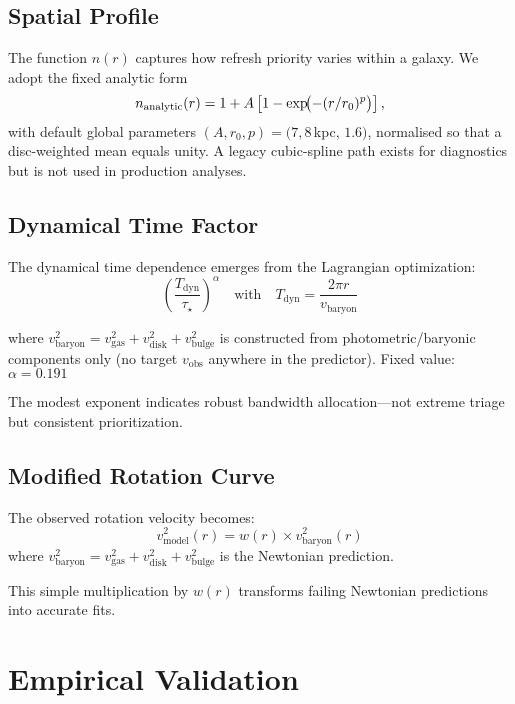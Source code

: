 \documentclass[usenatbib]{mnras}
\begin{document}
\subsection{Spatial Profile}

The function $n(r)$ captures how refresh priority varies within a galaxy. We adopt the fixed analytic form
\begin{equation}
n_{\rm analytic}(r) = 1 + A\left[1 - \exp\!\bigl(-(r/r_0)^p\bigr)\right],
\end{equation}
with default global parameters $(A, r_0, p) = (7, 8$\,kpc, $1.6)$, normalised so that a disc-weighted mean equals unity. A legacy cubic-spline path exists for diagnostics but is not used in production analyses.

\subsection{Dynamical Time Factor}

The dynamical time dependence emerges from the Lagrangian optimization:
\begin{equation}
\left(\frac{T_{\text{dyn}}}{\tau_\star}\right)^\alpha \quad \text{with} \quad T_{\text{dyn}} = \frac{2\pi r}{v_{\text{baryon}}}
\end{equation}

where $v_{\text{baryon}}^2 = v_{\text{gas}}^2 + v_{\text{disk}}^2 + v_{\text{bulge}}^2$ is constructed from photometric/baryonic components only (no target $v_{\text{obs}}$ anywhere in the predictor). Fixed value: $\alpha = 0.191$

The modest exponent indicates robust bandwidth allocation---not extreme triage but consistent prioritization.

\subsection{Modified Rotation Curve}

The observed rotation velocity becomes:
\begin{equation}
v_{\text{model}}^2(r) = w(r) \times v_{\text{baryon}}^2(r)
\end{equation}
where $v_{\text{baryon}}^2 = v_{\text{gas}}^2 + v_{\text{disk}}^2 + v_{\text{bulge}}^2$ is the Newtonian prediction.

This simple multiplication by $w(r)$ transforms failing Newtonian predictions into accurate fits.

\section{Empirical Validation}
\end{document}
